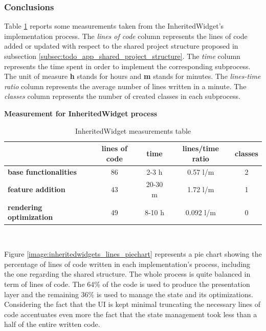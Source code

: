 \subsubsection{Conclusions} 
\label{subpar:render_optimizations_inherited_widget}
Table \ref{table:recap_inheritedwidgets} reports some measurements taken from the InheritedWidget's implementation process. The \textit{lines of code} column represents the lines of code added or updated with respect to the shared project structure proposed in subsection \ref{subsec:todo_app_shared_project_structure}. The \textit{time }column represents the time spent in order to implement the corresponding subprocess. The unit of measure \textbf{h} stands for hours and \textbf{m} stands for minutes. The \textit{lines-time ratio} column represents the average number of lines written in a minute. The \textit{classes} column represents the number of created classes in each subprocess.
\begin{table}[H]
    \caption*{\textbf{Measurement for InheritedWidget process}}
    \centering 
    
    \begin{tabular}{| l | c | c | c | c |}
    \hline
    \rowcolor{bluepoli!40} %
    \hline
     & \textbf{lines of code} & \textbf{time} & \textbf{lines/time ratio} & \textbf{classes} \T\B \\
     \hline
    \textbf{base functionalities} & 86 & 2-3 h & 0.57 l/m & 2  \T\B \\ 
    \textbf{feature addition} & 43 & 20-30 m & 1.72 l/m & 1 \T\B\\ 
    \textbf{rendering optimization} & 49 & 8-10 h & 0.092  l/m & 0 \B\\
    \hline
    \end{tabular}
    \\[10pt]
    \caption{InheritedWidget measurements table}
    \label{table:recap_inheritedwidgets}
\end{table}

Figure \ref{image:inheritedwidgets_lines_piechart} represents a pie chart showing the percentage of lines of code written in each implementation's process, including the one regarding the shared structure. The whole process is quite balanced in term of lines of code. The 64\% of the code is used to produce the presentation layer and the remaining 36\% is used to manage the state and its optimizations. Considering the fact that the UI is kept minimal truncating the necessary lines of code accentuates even more the fact that the state management took less than a half of the entire written code. 

